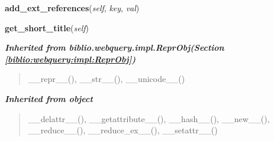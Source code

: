     \label{biblio:webquery:bibrecord:BibRecord:add_ext_references}

    \vspace{0.5ex}

\hspace{.8\funcindent}\begin{boxedminipage}{\funcwidth}

    \raggedright \textbf{add\_ext\_references}(\textit{self}, \textit{key}, \textit{val})

\setlength{\parskip}{2ex}
\setlength{\parskip}{1ex}
    \end{boxedminipage}

    \label{biblio:webquery:bibrecord:BibRecord:get_short_title}

    \vspace{0.5ex}

\hspace{.8\funcindent}\begin{boxedminipage}{\funcwidth}

    \raggedright \textbf{get\_short\_title}(\textit{self})

\setlength{\parskip}{2ex}
\setlength{\parskip}{1ex}
    \end{boxedminipage}


\large{\textbf{\textit{Inherited from biblio.webquery.impl.ReprObj\textit{(Section \ref{biblio:webquery:impl:ReprObj})}}}}

\begin{quote}
\_\_repr\_\_(), \_\_str\_\_(), \_\_unicode\_\_()
\end{quote}

\large{\textbf{\textit{Inherited from object}}}

\begin{quote}
\_\_delattr\_\_(), \_\_getattribute\_\_(), \_\_hash\_\_(), \_\_new\_\_(), \_\_reduce\_\_(), \_\_reduce\_ex\_\_(), \_\_setattr\_\_()
\end{quote}


